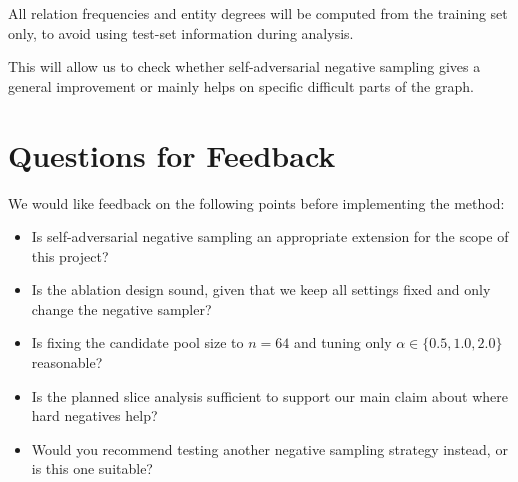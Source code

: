 \documentclass{llncs}
\begin{document}
All relation frequencies and entity degrees will be computed from the
training set only, to avoid using test-set information during analysis.

This will allow us to check whether self-adversarial negative sampling
gives a general improvement or mainly helps on specific difficult parts of
the graph.

\section{Questions for Feedback}

We would like feedback on the following points before implementing the
method:

\begin{itemize}
  \item Is self-adversarial negative sampling an appropriate extension for
        the scope of this project?
  \item Is the ablation design sound, given that we keep all settings fixed
        and only change the negative sampler?
  \item Is fixing the candidate pool size to $n=64$ and tuning only
        $\alpha \in \{0.5,1.0,2.0\}$ reasonable?
  \item Is the planned slice analysis sufficient to support our main claim
        about where hard negatives help?
  \item Would you recommend testing another negative sampling strategy
        instead, or is this one suitable?
\end{itemize}
\end{document}
